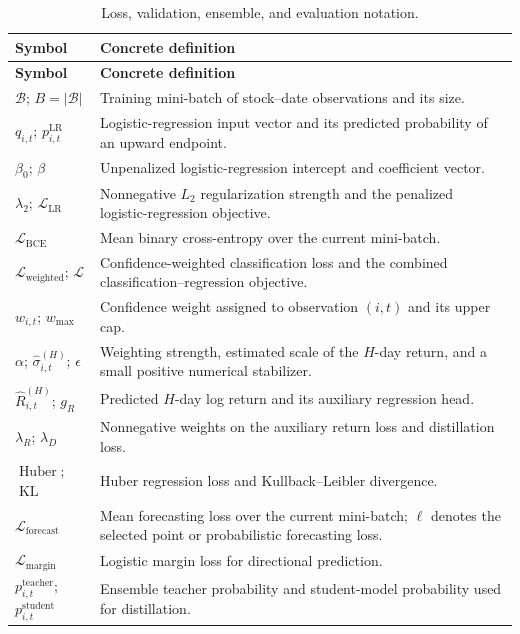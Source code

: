 \documentclass[11pt]{article}
\newcommand{\BCE}{\mathcal{L}_{\mathrm{BCE}}}
\begin{document}
{\begin{longtable}{@{}p{}p{}@{}}
\caption{Loss, validation, ensemble, and evaluation notation.}
\label{tab:notation-evaluation}\\
\toprule
\textbf{Symbol} & \textbf{Concrete definition} \\
\midrule
\endfirsthead
\toprule
\textbf{Symbol} & \textbf{Concrete definition} \\
\midrule
\endhead
$\mathcal B$; $B=|\mathcal B|$ & Training mini-batch of stock--date observations and its size. \\
$q_{i,t}$; $p^{\mathrm{LR}}_{i,t}$ & Logistic-regression input vector and its predicted probability of an upward endpoint. \\
$\beta_0$; $\beta$ & Unpenalized logistic-regression intercept and coefficient vector. \\
$\lambda_2$; $\mathcal L_{\mathrm{LR}}$ & Nonnegative $L_2$ regularization strength and the penalized logistic-regression objective. \\
$\BCE$ & Mean binary cross-entropy over the current mini-batch. \\
$\mathcal L_{\mathrm{weighted}}$; $\mathcal L$ & Confidence-weighted classification loss and the combined classification--regression objective. \\
$w_{i,t}$; $w_{\max}$ & Confidence weight assigned to observation $(i,t)$ and its upper cap. \\
$\alpha$; $\widehat\sigma_{i,t}^{(H)}$; $\epsilon$ & Weighting strength, estimated scale of the $H$-day return, and a small positive numerical stabilizer. \\
$\widehat R_{i,t}^{(H)}$; $g_R$ & Predicted $H$-day log return and its auxiliary regression head. \\
$\lambda_R$; $\lambda_D$ & Nonnegative weights on the auxiliary return loss and distillation loss. \\
$\operatorname{Huber}$; $\operatorname{KL}$ & Huber regression loss and Kullback--Leibler divergence. \\
$\mathcal L_{\mathrm{forecast}}$ & Mean forecasting loss over the current mini-batch; $\ell$ denotes the selected point or probabilistic forecasting loss. \\
$\mathcal L_{\mathrm{margin}}$ & Logistic margin loss for directional prediction. \\
$p^{\mathrm{teacher}}_{i,t}$; $p^{\mathrm{student}}_{i,t}$ & Ensemble teacher probability and student-model probability used for distillation. \\

\end{longtable}}
\end{document}
